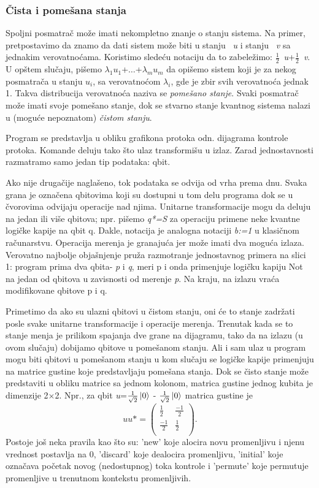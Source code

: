 \documentclass[a4paper]{article}
\begin{document}
{\subsubsection{Čista i pomešana stanja}
Spoljni posmatrač može imati nekompletno znanje o stanju sistema. Na primer, pretpostavimo da znamo da dati sistem može biti u stanju ~\emph{u} i stanju ~\emph{v} sa jednakim verovatnoćama. Koristimo sledeću notaciju da to zabeležimo: \( \frac{1}{2} \){~\emph{u}}+\( \frac{1}{2} \){~\emph{v}}. U opštem slučaju, pišemo $\lambda_1${$u_1$}+$\ldots$+$\lambda_m${$u_m$} da opišemo sistem koji je za nekog posmatrača u stanju $u_i$, sa verovatnoćom $\lambda_i$, gde je zbir svih verovatnoća jednak 1. Takva distribucija verovatnoća naziva se \textit{pomešano stanje}. Svaki posmatrač može imati svoje pomešano stanje, dok se stvarno stanje kvantnog sistema nalazi u (moguće nepoznatom) \textit{čistom stanju}.

Program se predstavlja u obliku grafikona protoka odn. dijagrama kontrole protoka. Komande deluju tako što ulaz transformišu u izlaz. Zarad jednostavnosti razmatramo samo jedan tip podataka: qbit.

Ako nije drugačije naglašeno, tok podataka se odvija od vrha prema dnu. Svaka grana je označena qbitovima koji su dostupni u tom delu programa dok se u čvorovima odvijaju operacije nad njima. Unitarne transformacije mogu da deluju na jedan ili više qbitova; npr. pišemo \textit{q*=S} za operaciju primene neke kvantne logičke kapije na qbit q. Dakle, notacija je analogna notaciji \textit{b:=1} u klasičnom računarstvu. Operacija merenja je granajuća jer može imati dva moguća izlaza.
Verovatno najbolje objašnjenje pruža razmotranje jednostavnog primera na slici 1: program prima dva qbita- \textit{p} i \textit{q}, meri p i onda primenjuje logičku kapiju Not na jedan od qbitova u zavisnosti od merenje \textit{p}. Na kraju, na izlazu vraća modifikovane qbitove p i q.

Primetimo da ako su ulazni qbitovi u čistom stanju, oni će to stanje zadržati posle svake unitarne transformacije i operacije merenja. Trenutak kada se to stanje menja je prilikom spajanja dve grane na dijagramu, tako da na izlazu (u ovom slučaju) dobijamo qbitove u pomešanom stanju. Ali i sam ulaz u program mogu biti qbitovi u pomešanom stanju u kom slučaju se logičke kapije primenjuju na matrice gustine koje predstavljaju pomešana stanja. Dok se čisto stanje može predstaviti u obliku matrice sa jednom kolonom, matrica gustine jednog kubita je dimenzije 2$\times$2. Npr., za qbit \textit{u}=$\frac{1}{\sqrt{2}}\ket{0}$ - $\frac{1}{\sqrt{2}}\ket{0}$ 
matrica gustine je \[\textit{uu*}= \left( \begin{array}{cc}
\frac{1}{2} & \frac{-1}{2} \\
\frac{-1}{2} & \frac{1}{2} \\
\end{array} \right).\]
Postoje još neka pravila kao što su: 'new' koje alocira novu promenljivu i njenu vrednost postavlja na 0, 'discard' koje dealocira promenljivu, 'initial' koje označava početak novog (nedostupnog) toka kontrole i 'permute' koje permutuje promenljive u trenutnom kontekstu promenljivih.

}
\end{document}
